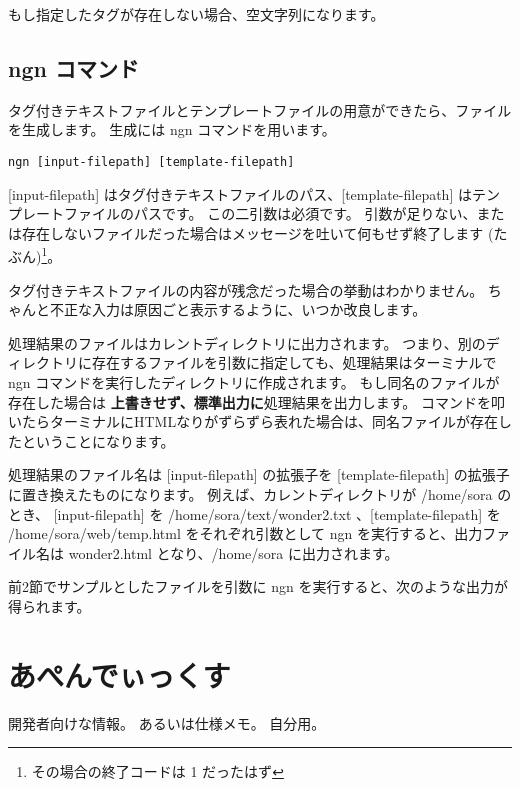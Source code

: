 \documentclass[a4j]{jsarticle}
\begin{document}
もし指定したタグが存在しない場合、空文字列になります。




\subsection{ngn コマンド}
タグ付きテキストファイルとテンプレートファイルの用意ができたら、ファイルを生成します。
生成には ngn コマンドを用います。

\begin{lstlisting}[caption=ngn コマンドの使い方]
  ngn [input-filepath] [template-filepath]
\end{lstlisting}

[input-filepath] はタグ付きテキストファイルのパス、[template-filepath] はテンプレートファイルのパスです。
この二引数は必須です。
引数が足りない、または存在しないファイルだった場合はメッセージを吐いて何もせず終了します (たぶん)\footnote{その場合の終了コードは 1 だったはず}。

タグ付きテキストファイルの内容が残念だった場合の挙動はわかりません。
ちゃんと不正な入力は原因ごと表示するように、いつか改良します。

処理結果のファイルはカレントディレクトリに出力されます。
つまり、別のディレクトリに存在するファイルを引数に指定しても、処理結果はターミナルで ngn コマンドを実行したディレクトリに作成されます。
もし同名のファイルが存在した場合は \textbf{上書きせず、標準出力に}処理結果を出力します。
コマンドを叩いたらターミナルにHTMLなりがずらずら表れた場合は、同名ファイルが存在したということになります。

処理結果のファイル名は [input-filepath] の拡張子を [template-filepath] の拡張子に置き換えたものになります。
例えば、カレントディレクトリが /home/sora のとき、 [input-filepath] を /home/sora/text/wonder2.txt 、[template-filepath] を /home/sora/web/temp.html をそれぞれ引数として ngn を実行すると、出力ファイル名は wonder2.html となり、/home/sora に出力されます。

前2節でサンプルとしたファイルを引数に ngn を実行すると、次のような出力が得られます。




\section{あぺんでぃっくす}
開発者向けな情報。
あるいは仕様メモ。
自分用。
\end{document}
